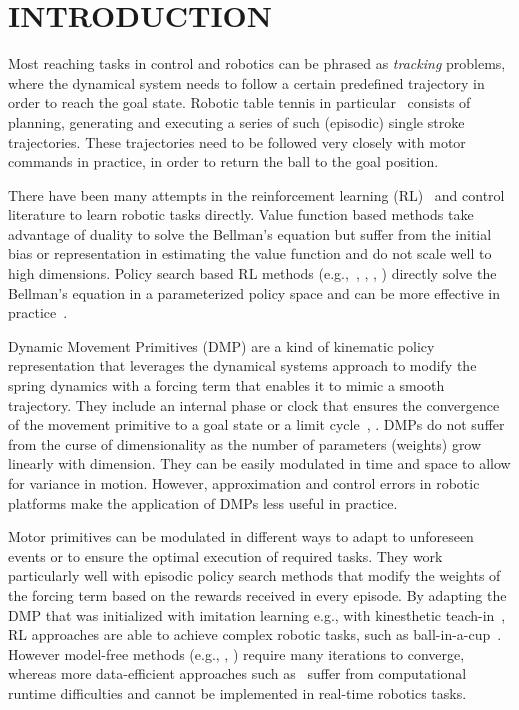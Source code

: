 \section{INTRODUCTION}\label{introduction}


Most reaching tasks in control and robotics can be phrased as \emph{tracking} problems, where the dynamical system needs to follow a certain predefined trajectory in order to reach the goal state. Robotic table tennis in particular~\cite{Muelling13} consists of planning, generating and executing a series of such (episodic) single stroke trajectories. These trajectories need to be followed very closely with motor commands in practice, in order to return the ball to the goal position. 

There have been many attempts in the reinforcement learning (RL)~\cite{Sutton98} and control literature to learn robotic tasks directly. Value function based methods take advantage of duality to solve the Bellman's equation but suffer from the initial bias or representation in estimating the value function and do not scale well to high dimensions. Policy search based RL methods (e.g.,~\cite{Kober08}, \cite{Peter10}, \cite{Theodorou10}, \cite{Deisenroth11}) directly solve the Bellman's equation in a parameterized policy space and can be more effective in practice~\cite{Kober13}. 

Dynamic Movement Primitives (DMP) are a kind of kinematic policy representation that leverages the dynamical systems approach to modify the spring dynamics with a forcing term that enables it to mimic a smooth trajectory. They include an internal phase or clock that ensures the convergence of the movement primitive to a goal state or a limit cycle~\cite{Ijspeert13}, \cite{Schaal07}. DMPs do not suffer from the curse of dimensionality as the number of parameters (weights) grow linearly with dimension. They can be easily modulated in time and space to allow for variance in motion. However, approximation and control errors in robotic platforms make the application of DMPs less useful in practice. %

Motor primitives can be modulated in different ways to adapt to unforeseen events or to ensure the optimal execution of required tasks. They work particularly well with episodic policy search methods that modify the weights of the forcing term based on the rewards received in every episode. By adapting the DMP that was initialized with imitation learning e.g., with kinesthetic teach-in~\cite{Muelling13}, RL approaches are able to achieve complex robotic tasks, such as ball-in-a-cup~\cite{Kober09}. However model-free methods (e.g., \cite{Kober08}, \cite{Peter10}) require many iterations to converge, whereas more data-efficient approaches such as~\cite{Deisenroth11} suffer from computational runtime difficulties and cannot be implemented in real-time robotics tasks. %

